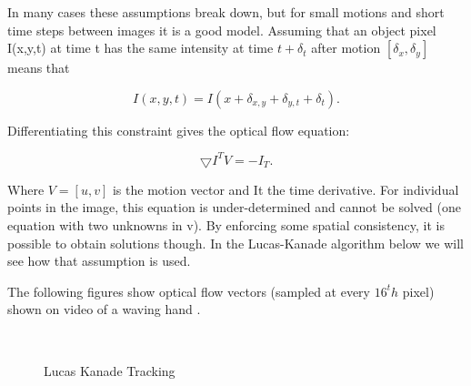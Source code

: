 In many cases these assumptions break down, but for small motions and short time steps between images it is a good model. Assuming that an object pixel I(x,y,t) at time t has the same intensity at time $t+\delta_t$ after motion $[\delta_x, \delta_y]$ means that 
\begin{dBox}
\begin{equation}
I(x,y,t) =I(x + \delta_{x,y} + \delta_{y,t} + \delta_t).
\end{equation}
\end{dBox}

Differentiating this constraint gives the optical flow equation:

\begin{dBox}
\begin{equation}
\bigtriangledown I^T V = - I_T.
\end{equation}
\end{dBox}

Where $V = [u, v]$ is the motion vector and It the time derivative. For individual points in the image, this equation is under-determined and cannot be solved (one equation with two unknowns in v). By enforcing some spatial consistency, it is possible to obtain solutions though. In the Lucas-Kanade algorithm below we will see how that assumption is used.\bigskip

The following figures show optical flow vectors (sampled at every $16^th$ pixel) shown on video of a waving hand \cite{dynamic3}. 

\begin{figure}[h]
\begin{dBox}
\centering
  \mbox{
   }
   \caption{Lucas Kanade Tracking \label{fig:dynamic678} }   
\end{dBox}   
\end{figure}

